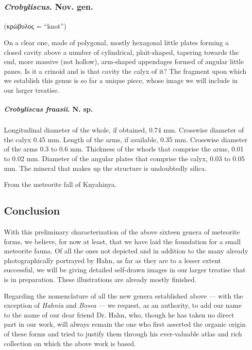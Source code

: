 \documentclass[a4paper, 12pt, oneside]{article}
\begin{document}
\subsubsection{\emph{Crobyliscus}. Nov. gen.}
\paragraph*{}
(κρὠβυλος = ``knot'')%

On a clear one, made of polygonal, mostly hexagonal little plates forming a closed cavity above a number of cylindrical, plait-shaped, tapering towards the end, more massive (not hollow), arm-shaped appendages formed of angular little panes. Is it a crinoid and is that cavity the calyx of it? The fragment upon which we establish this genus is so far a unique piece, whose image we will include in our larger treatise.
\paragraph{\emph{Crobyliscus fraasii}. N. sp.}
\subparagraph{}
Longitudinal diameter of the whole, if obtained, 0.74 mm. Crosswise diameter of the calyx 0.45 mm. Length of the arms, if available, 0.35 mm. Crosswise diameter of the arms 0.3 to 0.6 mm. Thickness of the whorls that comprise the arms, 0.01 to 0.02 mm. Diameter of the angular plates that comprise the calyx, 0.03 to 0.05 mm. The mineral that makes up the structure is undoubtedly silica.

From the meteorite fall of Knyahinya.
\clearpage
\subsection{Conclusion}
\paragraph*{}
With this preliminary characterization of the above sixteen genera of meteorite forms, we believe, for now at least, that we have laid the foundation for a small meteorite fauna. Of all the ones not depicted and in addition to the many already photographically portrayed by Hahn, as far as they are to a lesser extent successful, we will be giving detailed self-drawn images in our larger treatise that is in preparation. These illustrations are already mostly finished.

Regarding the nomenclature of all the new genera established above --- with the exception of \emph{Hahnia} and \emph{Bosea} --- we request, as an authority, to add our name to the name of our dear friend Dr. Hahn, who, though he has taken no direct part in our work, will always remain the one who first asserted the organic origin of these forms and tried to justify them through his ever-valuable atlas and rich collection on which the above work is based.
\end{document}
